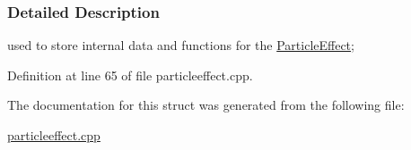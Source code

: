 \subsubsection{Detailed Description}
used to store internal data and functions for the \hyperlink{classMezzanine_1_1ParticleEffect}{ParticleEffect}; 

Definition at line 65 of file particleeffect.cpp.



The documentation for this struct was generated from the following file:\begin{DoxyCompactItemize}
\item 
\hyperlink{particleeffect_8cpp}{particleeffect.cpp}\end{DoxyCompactItemize}
